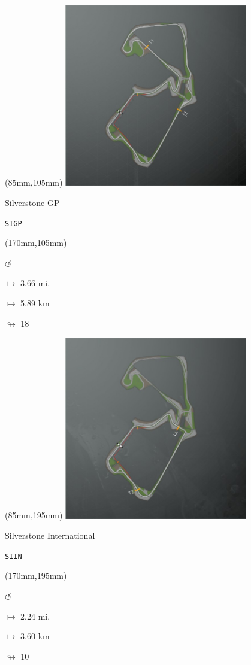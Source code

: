 \begin{textblock*}{80mm}(85mm,105mm)%
\includegraphics[width=80mm]{TR/2015-05-20_00056.png}
\centerline{Silverstone GP}
\par\hfill\tiny\tt SIGP\\
\end{textblock*}
\begin{textblock*}{30mm}(170mm,105mm)%
\par \Huge$\circlearrowleft$
\Large
\par$\mapsto$ 3.66 mi.
\par$\mapsto$ 5.89 km
\par$\looparrowright$ 18
\end{textblock*}
\begin{textblock*}{80mm}(85mm,195mm)%
\includegraphics[width=80mm]{TR/2015-05-20_00057.png}
\centerline{Silverstone International}
\par\hfill\tiny\tt SIIN\\
\end{textblock*}
\begin{textblock*}{30mm}(170mm,195mm)%
\par \Huge$\circlearrowleft$
\Large
\par$\mapsto$ 2.24 mi.
\par$\mapsto$ 3.60 km
\par$\looparrowright$ 10
\end{textblock*}
\null\newpage

